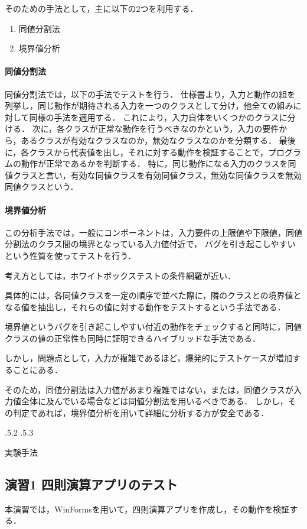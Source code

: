 \documentclass[platex,dvipdfmx,12pt]{jsarticle}
\makeatletter
\renewcommand{\section}{%
\clearpage
\@startsection{section}{1}{\z@}%
{\Cvs \@plus.5\Cdp \@minus.2\Cdp}%
{.5\Cvs \@plus.3\Cdp}%
{\normalfont\LARGE\headfont\raggedright}}%
\makeatother
\begin{document}
そのための手法として，主に以下の2つを利用する．

\begin{enumerate}
  \item 同値分割法
  \item 境界値分析
\end{enumerate}

\paragraph{同値分割法}
同値分割法では，以下の手法でテストを行う．
仕様書より，入力と動作の組を列挙し，同じ動作が期待される入力を一つのクラスとして分け，他全ての組みに対して同様の手法を適用する．
これにより，入力自体をいくつかのクラスに分ける．
次に，各クラスが正常な動作を行うべきなのかという，入力の要件から，あるクラスが有効なクラスなのか，無効なクラスなのかを分類する．
最後に，各クラスから代表値を出し，それに対する動作を検証することで，プログラムの動作が正常であるかを判断する．
特に，同じ動作になる入力のクラスを同値クラスと言い，有効な同値クラスを有効同値クラス，無効な同値クラスを無効同値クラスという．

\paragraph{境界値分析}
この分析手法では，一般にコンポーネントは，入力要件の上限値や下限値，同値分割法のクラス間の境界となっている入力値付近で，
バグを引き起こしやすいという性質を使ってテストを行う．

考え方としては，ホワイトボックステストの条件網羅が近い．

具体的には，各同値クラスを一定の順序で並べた際に，隣のクラスとの境界値となる値を抽出し，それらの値に対する動作をテストするという手法である．

境界値というバグを引き起こしやすい付近の動作をチェックすると同時に，同値クラスの値の正常性も同時に証明できるハイブリッドな手法である．

しかし，問題点として，入力が複雑であるほど，爆発的にテストケースが増加することにある．

そのため，同値分割法は入力値があまり複雑ではない，または，同値クラスが入力値全体に及んでいる場合などは同値分割法を用いるべきである．
しかし，その判定であれば，境界値分析を用いて詳細に分析する方が安全である．


\section{実験手法}
\subsection{演習1 四則演算アプリのテスト}
本演習では，WinFormsを用いて，四則演算アプリを作成し，その動作を検証する．
\end{document}
